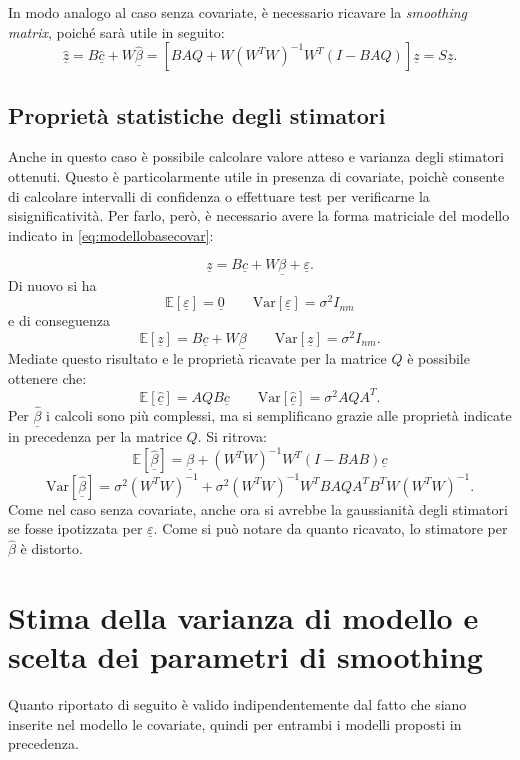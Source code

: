 \documentclass[a4paper,11pt,twoside,openright]{book}							%
\begin{document}
In modo analogo al caso senza covariate, è necessario ricavare la \textit{smoothing matrix}, poiché sarà utile in seguito:
$$
\hat  {\underline z} =B\hat  {\underline c} + W \hat  {\underline \beta} = [B AQ + W(W^TW)^{-1}W^T(I-B AQ)]\underline z = S\underline z .
$$

\subsection{Proprietà statistiche degli stimatori}
\label{sec:IC}
Anche in questo caso è possibile calcolare valore atteso e varianza degli stimatori ottenuti. Questo è particolarmente utile in presenza di covariate, poichè consente di calcolare intervalli di confidenza o effettuare test per verificarne la sisignificatività. Per farlo, però, è necessario avere la forma matriciale del modello indicato in \ref{eq:modellobasecovar}:

\begin{equation}
\label{eq:modellobasecovarmatric}
\underline z=B \underline c + W \underline \beta + \underline \varepsilon .
\end{equation}
Di nuovo si ha 
$$
\mathbb{E}[\underline \varepsilon] = \underline 0 \qquad \mathrm{Var}[\underline \varepsilon] = \sigma^2 I_{nm}
$$
e di conseguenza
$$
\mathbb{E}[\underline z] = B \underline c + W \underline \beta \qquad \mathrm{Var}[\underline z] = \sigma^2 I_{nm} .
$$
Mediate questo risultato e le proprietà ricavate per la matrice $Q$ è possibile ottenere che:
$$
\mathbb{E}[\hat  {\underline c}] = AQB \underline c \qquad \mathrm{Var}[\hat  {\underline c}] = \sigma^2 AQA^T .
$$
Per $\hat  {\underline \beta}$ i calcoli sono più complessi, ma si semplificano grazie alle proprietà indicate in precedenza per la matrice $Q$. Si ritrova:
$$
\mathbb{E}[\hat  {\underline \beta}] = \underline \beta + (W^TW)^{-1}W^T(I-B AB)\underline c
$$
$$ \mathrm{Var}[\hat  {\underline \beta}] = \sigma^2 (W^TW)^{-1} + \sigma^2 (W^TW)^{-1}W^T B A Q A^T B^T W(W^TW)^{-1}.
$$
Come nel caso senza covariate, anche ora si avrebbe la gaussianità degli stimatori se fosse ipotizzata per $\underline \varepsilon$. Come si può notare da quanto ricavato, lo stimatore per $\hat{\beta}$ è distorto.


\section{Stima della varianza di modello e scelta dei parametri di smoothing}
\label{sez:GCV}

Quanto riportato di seguito è valido indipendentemente dal fatto che siano inserite nel modello le covariate, quindi per entrambi i modelli proposti in precedenza.
\end{document}
